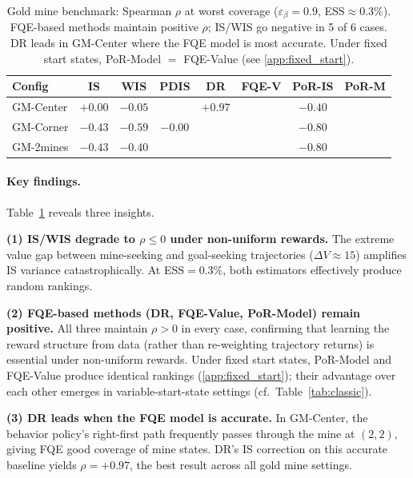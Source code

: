 \documentclass[10pt]{article}
\theoremstyle{plain}
\theoremstyle{definition}
\theoremstyle{remark}
\newcommand{\good}[1]{{\color{goodgreen}\textbf{#1}}}
\newcommand{\bad}[1]{{\color{badred}\textbf{#1}}}
\newcommand{\med}[1]{{\color{medorange}{#1}}}
\begin{document}
\begin{table}[t]
  \centering\small
  \caption{Gold mine benchmark: Spearman $\rho$ at worst coverage ($\varepsilon_\beta=0.9$,
    ESS$\approx$0.3\%).  FQE-based methods maintain positive $\rho$;
    IS/WIS go negative in 5 of 6 cases.  DR leads in GM-Center where the FQE
    model is most accurate.  Under fixed start states, PoR-Model $=$ FQE-Value
    (see \cref{app:fixed_start}).}
  \label{tab:goldmine}
  \begin{tabular}{lccccccc}
    \toprule
    Config & IS & WIS & PDIS & DR & FQE-V & PoR-IS & \textbf{PoR-M}\\
    \midrule
    GM-Center  & \bad{$+0.00$} & \bad{$-0.05$} & \med{$+0.28$}
               & \good{$\mathbf{+0.97}$} & \med{$+0.80$} & \bad{$-0.40$} & \med{$+0.80$}\\
    GM-Corner  & \bad{$-0.43$} & \bad{$-0.59$} & \bad{$-0.00$}
               & \med{$+0.56$} & \med{$+0.40$} & \bad{$-0.80$} & \med{$+0.40$}\\
    GM-2mines  & \bad{$-0.43$} & \bad{$-0.40$} & \med{$+0.11$}
               & \med{$+0.67$} & \med{$+0.40$} & \bad{$-0.80$} & \med{$+0.40$}\\
    \bottomrule
  \end{tabular}
\end{table}

\paragraph{Key findings.}
Table~\ref{tab:goldmine} reveals three insights.

\textbf{(1) IS/WIS degrade to $\rho\leq 0$ under non-uniform rewards.}
The extreme value gap between mine-seeking and goal-seeking trajectories
($\Delta V\approx 15$) amplifies IS variance catastrophically.  At ESS$=0.3\%$,
both estimators effectively produce random rankings.

\textbf{(2) FQE-based methods (DR, FQE-Value, PoR-Model) remain positive.}
All three maintain $\rho>0$ in every case, confirming that learning the
reward structure from data (rather than re-weighting trajectory returns) is
essential under non-uniform rewards.  Under fixed start states, PoR-Model and
FQE-Value produce identical rankings (\cref{app:fixed_start}); their advantage
over each other emerges in variable-start-state settings (cf.\
Table~\ref{tab:classic}).

\textbf{(3) DR leads when the FQE model is accurate.}
In GM-Center, the behavior policy's right-first path frequently passes through
the mine at $(2,2)$, giving FQE good coverage of mine states.  DR's IS
correction on this accurate baseline yields $\rho=+0.97$, the best result
across all gold mine settings.
\end{document}
